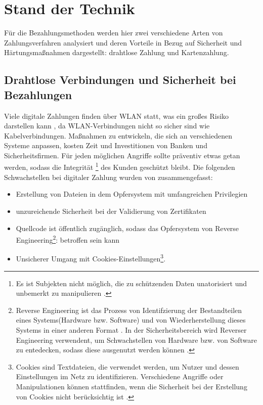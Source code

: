 \section{Stand der Technik}

Für die Bezahlungsmethoden werden hier zwei verschiedene Arten von Zahlungsverfahren analysiert und deren
Vorteile in Bezug auf Sicherheit und Härtungsmaßnahmen dargestellt: drahtlose Zahlung und Kartenzahlung.

\subsection{Drahtlose Verbindungen und Sicherheit bei Bezahlungen}

Viele digitale Zahlungen finden über WLAN statt, was ein großes Risiko darstellen kann \cite{refip:NYRS}, 
da WLAN-Verbindungen nicht so sicher sind wie Kabelverbindungen. Maßnahmen zu entwickeln, die sich an 
verschiedenen Systeme anpassen, kosten Zeit und Investitionen von Banken und Sicherheitsfirmen. 
Für jeden möglichen Angriffe sollte präventiv etwas getan werden, sodass die Integrität 
\footnote{Es ist Subjekten nicht möglich, die zu schützenden Daten unatorisiert und unbemerkt zu manipulieren 
\cite{refbook:SWIS}.} des Kunden geschützt bleibt. Die folgenden Schwachstellen bei digitaler Zahlung wurden 
von \cite{refip:NYRS} zusammengefasst:

\begin{itemize}
    \item Erstellung von Dateien in dem Opfersystem mit umfangreichen Privilegien
    \item unzureichende Sicherheit bei der Validierung von Zertifikaten
    \item Quellcode ist öffentlich zugänglich, sodass das Opfersystem von Reverse
    Engineering\footnote{Reverse Engineering ist das Prozess von Identifzierung der Bestandteilen 
    eines Systems(Hardware bzw. Software) und von Wiederherstellung dieses Systems in einer anderen Format
    \cite{refart:CHRE}. In der Sicherheitsbereich wird Reverser Engineering verwendent, um Schwachstellen 
    von Hardware bzw. von Software zu entedecken, sodass diese ausgenutzt werden können \cite{refip:CMBM}.}: 
    betroffen sein kann
    \item Unsicherer Umgang mit Cookies-Einstellungen\footnote{Cookies sind Textdateien, die verwendet werden, um Nutzer und
    dessen Einstellungen im Netz zu identifizieren. Verschiedene Angriffe oder Manipulationen können stattfinden,
    wenn die Sicherheit bei der Erstellung von Cookies nicht berücksichtig ist \cite{refart:HSSC}.}.
\end{itemize}

